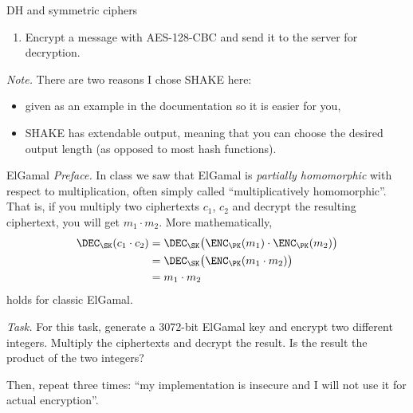 \documentclass{practice}
\begin{document}
\begin{task}{DH and symmetric ciphers}
\begin{enumerate}
    To get PFS, both the server and the client must contribute to the ephemeral session key.
    Otherwise it becomes static-ephemeral DH, which does not provide PFS.

    Some more info on static-ephemeral DH \href{https://crypto.stackexchange.com/a/61760}{\emph{here}}.

    \item Encrypt a message with AES-128-CBC and send it to the server for decryption.
  \end{enumerate}

  \textit{Note.}
  There are two reasons I chose SHAKE here:
  \begin{itemize}
    \item given as an example in the documentation so it is easier for you,
    \item SHAKE has extendable output, meaning that you can choose the desired output length (as opposed to most hash functions).
  \end{itemize}
\end{task}

\begin{task}{ElGamal}
  \textit{Preface.}
  In class we saw that ElGamal is \emph{partially homomorphic} with respect to multiplication, often simply called \enquote{multiplicatively homomorphic}.
  That is, if you multiply two ciphertexts $c_1$, $c_2$ and decrypt the resulting ciphertext, you will get $m_1 \cdot m_2$.
  More mathematically,
  \begin{align*}
    \DEC_\SK(c_1 \cdot c_2) &= 
    \DEC_\SK\bigl(\ENC_\PK(m_1) \cdot \ENC_\PK(m_2)\bigr)\\
    &= \DEC_\SK\bigl(\ENC_\PK(m_1\cdot m_2)\bigr)\\
    &= m_1 \cdot m_2
  \end{align*}
  holds for classic ElGamal.

  \textit{Task.}
  For this task, generate a $3072$-bit ElGamal key and encrypt two different integers.
  Multiply the ciphertexts and decrypt the result.
  Is the result the product of the two integers?

  Then, repeat three times: \enquote{my implementation is insecure and I will not use it for actual encryption}.
\end{task}
\end{document}
